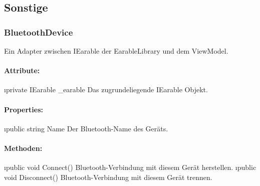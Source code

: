 \documentclass[../entwurf.tex]{subfiles}
\begin{document}
		\subsection{Sonstige}
			\subsubsection{BluetoothDevice}
				Ein Adapter zwischen IEarable der EarableLibrary und dem ViewModel.
				\paragraph{Attribute:}
					\begin{itemize}
						\i{private IEarable \_earable} Das zugrundeliegende IEarable Objekt.
					\end{itemize}
				\paragraph{Properties:}
					\begin{itemize}
						\i{public string Name} Der Bluetooth-Name des Geräts.
					\end{itemize}
				\paragraph{Methoden:}
					\begin{itemize}
						\i{public void Connect()} Bluetooth-Verbindung mit diesem Gerät herstellen.
						\i{public void Disconnect()} Bluetooth-Verbindung mit diesem Gerät trennen.
					\end{itemize}
					
\end{document}
